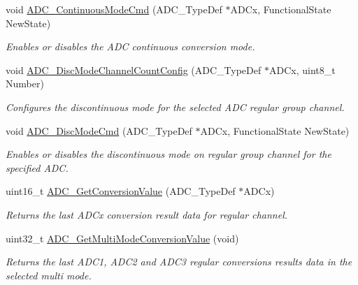 \begin{DoxyCompactItemize}
void \hyperlink{group___a_d_c___group4_ga879d70e9345d35688590938503f961db}{A\-D\-C\-\_\-\-Continuous\-Mode\-Cmd} (A\-D\-C\-\_\-\-Type\-Def $\ast$A\-D\-Cx, Functional\-State New\-State)
\begin{DoxyCompactList}\small\item\em Enables or disables the A\-D\-C continuous conversion mode. \end{DoxyCompactList}\item 
void \hyperlink{group___a_d_c___group4_ga6eb241ba82d67d1371136c9132083937}{A\-D\-C\-\_\-\-Disc\-Mode\-Channel\-Count\-Config} (A\-D\-C\-\_\-\-Type\-Def $\ast$A\-D\-Cx, uint8\-\_\-t Number)
\begin{DoxyCompactList}\small\item\em Configures the discontinuous mode for the selected A\-D\-C regular group channel. \end{DoxyCompactList}\item 
void \hyperlink{group___a_d_c___group4_ga1909649d10253ce88d986ffbb94a4be6}{A\-D\-C\-\_\-\-Disc\-Mode\-Cmd} (A\-D\-C\-\_\-\-Type\-Def $\ast$A\-D\-Cx, Functional\-State New\-State)
\begin{DoxyCompactList}\small\item\em Enables or disables the discontinuous mode on regular group channel for the specified A\-D\-C. \end{DoxyCompactList}\item 
uint16\-\_\-t \hyperlink{group___a_d_c___group4_gaaf74221c285ec5dab5e66baf7bec6bd3}{A\-D\-C\-\_\-\-Get\-Conversion\-Value} (A\-D\-C\-\_\-\-Type\-Def $\ast$A\-D\-Cx)
\begin{DoxyCompactList}\small\item\em Returns the last A\-D\-Cx conversion result data for regular channel. \end{DoxyCompactList}\item 
uint32\-\_\-t \hyperlink{group___a_d_c___group4_ga989f4365b56be99999b8ec096aba2081}{A\-D\-C\-\_\-\-Get\-Multi\-Mode\-Conversion\-Value} (void)
\begin{DoxyCompactList}\small\item\em Returns the last A\-D\-C1, A\-D\-C2 and A\-D\-C3 regular conversions results data in the selected multi mode. \end{DoxyCompactList}\end{DoxyCompactItemize}


